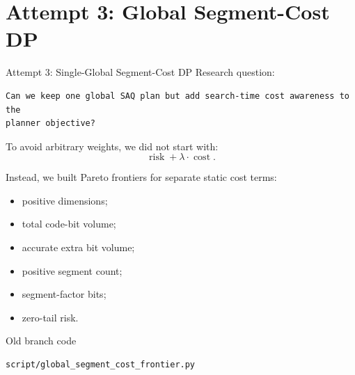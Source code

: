 \documentclass[aspectratio=169,10pt]{beamer}
\begin{document}
\section{Attempt 3: Global Segment-Cost DP}

\begin{frame}[fragile]{Attempt 3: Single-Global Segment-Cost DP}
\small
Research question:
\begin{lstlisting}
Can we keep one global SAQ plan but add search-time cost awareness to the
planner objective?
\end{lstlisting}

To avoid arbitrary weights, we did not start with:
\[
\operatorname{risk} + \lambda\cdot\operatorname{cost}.
\]

Instead, we built Pareto frontiers for separate static cost terms:
\begin{itemize}
  \item positive dimensions;
  \item total code-bit volume;
  \item accurate extra bit volume;
  \item positive segment count;
  \item segment-factor bits;
  \item zero-tail risk.
\end{itemize}

\begin{block}{Old branch code}
\begin{lstlisting}
script/global_segment_cost_frontier.py
\end{lstlisting}
\end{block}
\end{frame}
\end{document}
